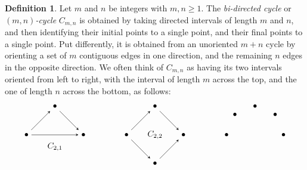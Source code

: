 \documentclass[a4paper, 11 pt, oneside, reqno]{amsart}
\numberwithin{lemma}{section}
\theoremstyle{definition}
\newtheorem{definition}[lemma]{Definition}
\begin{document}
\begin{definition}
    Let $m$ and $n$ be integers with $m,n\geq 1$.
    The \emph{bi-directed cycle} or \emph{$(m,n)$-cycle} 
    $C_{m,n}$ is obtained  by taking 
    directed intervals of length $m$ and $n$, 
    and then identifying their initial points to a single point,
    and their final points to a single point.
    Put differently, it is obtained from an unoriented $m+n$
    cycle by orienting a set of $m$ contiguous edges 
    in one direction,
    and the remaining $n$ edges in the opposite direction.
    We often think of $C_{m,n}$ as having its two intervals 
    oriented from left to right, with the interval of length $m$
    across the top, and the one of length $n$ across the bottom,
    as follows:
    \[
        \begin{tikzpicture}[baseline=0]
            \node(x) at (180:1.2) {$\bullet$};
            \node(y) at (0:1.2) {$\bullet$};
    
            \node (a2) at (90:1.2) {$\bullet$};
            
            \draw[-stealth] (x) -- (a2);
            \draw[-stealth] (a2) -- (y);
    
            \draw[-stealth] (x) -- (y);
            
            \node () at (-90:0.5) {$C_{2,1}$};
        \end{tikzpicture}
        \qquad\qquad
        \begin{tikzpicture}[baseline=0]
            \node(x) at (180:1.2) {$\bullet$};
            \node(y) at (0:1.2) {$\bullet$};
    
            \node (a2) at (90:1.2) {$\bullet$};
            \node (b2) at (-90:1.2) {$\bullet$};
            
            \draw[-stealth] (x) -- (a2);
            \draw[-stealth] (a2) -- (y);
    
            \draw[-stealth] (x) -- (b2);
            \draw[-stealth] (b2) -- (y);
            
            \node () at (0:0) {$C_{2,2}$};
        \end{tikzpicture}
        \qquad\qquad
        \begin{tikzpicture}[baseline=0]
            \node(x) at (180:1.2) {$\bullet$};
            \node(y) at (0:1.2) {$\bullet$};
    
            \node (a2) at (135:1.2) {$\bullet$};
            \node (a3) at (90:1.2) {$\bullet$};
            \node (a4) at (45:1.2) {$\bullet$};
    

\end{tikzpicture}\]
\end{definition}
\end{document}
